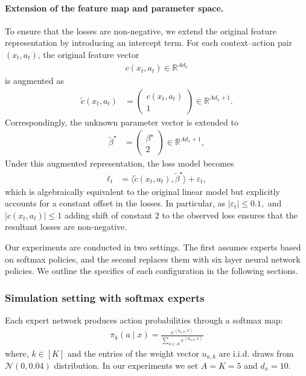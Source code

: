 \documentclass[11pt,letterpaper]{article}
\newcommand{\loss}{\ell}
\theoremstyle{plain}
\theoremstyle{definition}  %
\begin{document}
\paragraph{Extension of the feature map and parameter space.}
To ensure that the losses are non-negative,  we extend the original feature representation by introducing an intercept term. For each context–action pair $(x_t, a_t)$, the original feature vector
\begin{align*}
c(x_t, a_t) \in \mathbb{R}^{A d_x}
\end{align*}
is augmented as
\begin{align*}
\tilde{c}(x_t, a_t)
&=
\begin{pmatrix}
c(x_t, a_t) \\
1
\end{pmatrix}
\in
\mathbb{R}^{A d_x + 1}.
\end{align*}
\noindent Correspondingly, the unknown parameter vector is extended to
\begin{align*}
\tilde{\beta}^\star
&=
\begin{pmatrix}
\beta^\star \\
2
\end{pmatrix}
\in
\mathbb{R}^{A d_x + 1},
\end{align*}
Under this augmented representation, the loss model becomes
\begin{align*}
\loss_t
&=
\langle \tilde{c}(x_t, a_t), \tilde{\beta}^\star \rangle + \varepsilon_t,
\end{align*}
which is algebraically equivalent to the original linear model but explicitly accounts for a constant offset in the losses. In particular, as $|\varepsilon_t| \leq 0.1,$ and $|c(x_t,a_t)| \leq 1$ adding shift of constant $2$ to the observed loss ensures that the resultant losses are non-negative.



\noindent Our experiments are conducted in two settings. The first assumes experts based on softmax policies, and the second replaces them with  six layer neural network policies. We outline the specifics of each configuration in the following sections.


\subsubsection*{Simulation setting with softmax experts}

\noindent Each expert network produces action probabilities through a softmax map: 
\begin{align*}
\pi_k(a\mid x)= \frac{e^{\left\langle u_{a,k},x \right\rangle}}{\sum_{a \in \mathcal{A}} e^{\left\langle u_{a,k},x \right\rangle}} 
\end{align*}
where, $k \in [K]$ and the entries of the  weight vector $u_{a,k}$ are i.i.d.  draws from $\mathcal{N}(0,0.04)$ distribution. In our experiments we set $A = K = 5$ and $d_x = 10$. 
\end{document}
